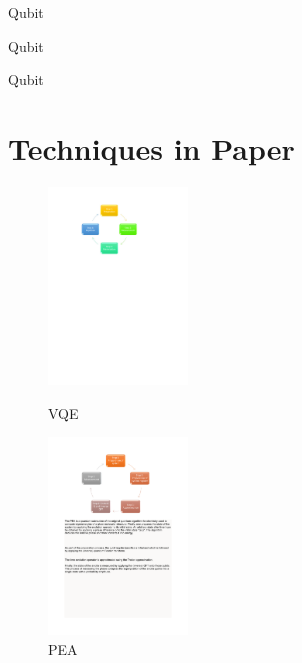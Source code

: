 \documentclass[14pt,landscape,color=UCLdarkred,margin=3cm]{uclposter}
\begin{document}
\begin{multicols}{3}
\begin{highlightbox}
	Qubit
\end{highlightbox}

\begin{highlightbox}
	Qubit
\end{highlightbox}

\begin{highlightbox}
	Qubit
\end{highlightbox}

\columnbreak

\section*{Techniques in Paper}



\begin{figure}[H]
  \begin{center}
  \begin{minipage}[c]{12em}
    
    \includegraphics[width=10em]{VQEdiagram.pdf}
    \caption{VQE}
  \end{minipage}
  \qquad
  \begin{minipage}[c]{12em}
    \centering
    \includegraphics[width=10em]{PEA.pdf}
    \caption{PEA}
  \end{minipage}
  \end{center}


\end{figure}
\end{multicols}
\end{document}
